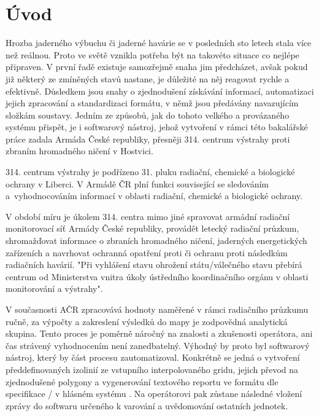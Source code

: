 \chapter{Úvod}
\label{1-uvod}

Hrozba jaderného výbuchu či jaderné havárie se v
posledních sto letech stala více než reálnou. Proto ve světě vznikla
potřeba být na takovéto situace co nejlépe připraven. V první řadě
existuje samozřejmě snaha jim předcházet, avšak pokud již některý ze
zmíněných stavů nastane, je důležité na něj reagovat rychle a
efektivně.  Důsledkem jsou snahy o zjednodušení získávání informací,
automatizaci jejich zpracování a standardizaci formátu, v němž jsou
předávány navazujícím složkám soustavy. Jedním ze způsobů, jak do
tohoto velkého a provázaného systému přispět, je i softwarový
nástroj, jehož vytvoření v rámci této bakalářské práce zadala Armáda
České republiky, přesněji 314. centrum výstrahy proti zbraním
hromadného ničení v Hostvici.

314. centrum výstrahy  je podřízeno 31. pluku radiační,
chemické a bio\-logické ochrany v Liberci. V Armádě ČR plní funkci
související se sledováním a~vyhodnocováním informací v oblasti
radiační, chemické a biologické ochrany.

V období míru je úkolem 314. centra mimo jiné spravovat armádní
radiační monitorovací síť Armády České republiky, provádět letecký
radiační průzkum, shromažďovat informace o zbraních hromadného ničení,
jaderných energetických zařízeních a navrhovat ochranná opatření proti
 či ochranu proti následkům radiačních havárií. "Při vyhlášení
stavu ohrožení státu/válečného stavu přebírá centrum od Ministerstva
vnitra úkoly ústředního koordinačního orgánu v oblasti moni\-torování a
výstrahy". \cite{ZHN}

V současnosti AČR zpracovává hodnoty naměřené v rámci radiačního
průzkumu ručně, za výpočty a zakreslení výsledků do mapy je zodpovědná
analytická skupina. Tento proces je poměrně náročný na znalosti a
zkušenosti operátora, ani čas strávený vyhodnocením není
zanedbatelný. Výhodný by proto byl softwarový nástroj, který by část
procesu zautomatizoval. Konkrétně se jedná o vytvoření
předdefinovaných izolinií ze vstupního interpolovaného gridu, jejich
převod na zjednodušené polygony a vygenerování textového reportu ve
formátu dle specifikace / v hlásném systému
. Na operátorovi pak zůstane následné vložení zprávy do
softwaru určeného k varování a uvědomování ostatních jednotek.

